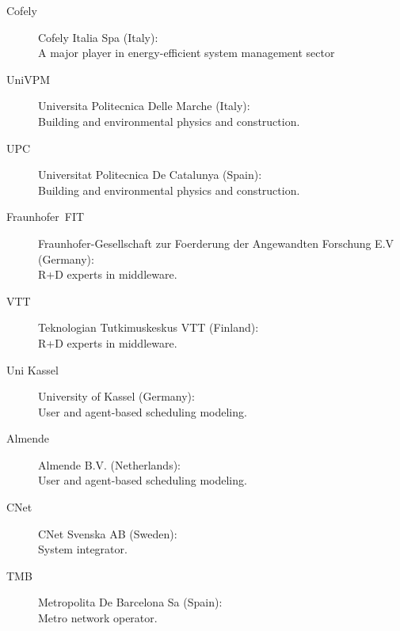 \begin{description}
  \item[Cofely] Cofely Italia Spa (Italy):\\A major player in energy-efficient system management sector
  \item[UniVPM] Universita Politecnica Delle Marche (Italy):\\Building and environmental physics and construction.
  \item[UPC] Universitat Politecnica De Catalunya (Spain):\\Building and environmental physics and construction.
  \item[Fraunhofer~FIT] Fraunhofer-Gesellschaft zur Foerderung der Angewandten Forschung E.V (Germany):\\R+D experts in middleware.
  \item[VTT] Teknologian Tutkimuskeskus VTT (Finland):\\R+D experts in middleware.
  \item[Uni Kassel] University of Kassel (Germany):\\User and agent-based scheduling modeling.
  \item[Almende] Almende B.V. (Netherlands):\\User and agent-based scheduling modeling.
  \item[CNet] CNet Svenska AB (Sweden):\\System integrator.
  \item[TMB] Metropolita De Barcelona Sa (Spain):\\Metro network operator.
\end{description}



%  
%    


